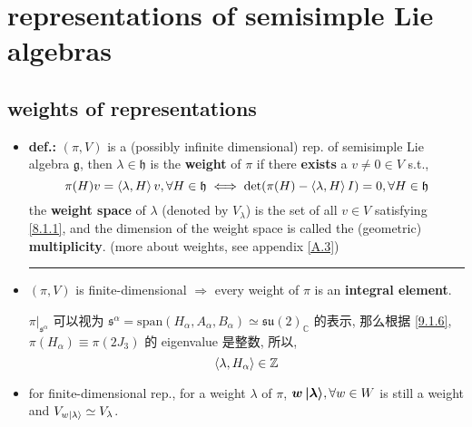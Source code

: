 \chapter{representations of semisimple Lie algebras}
\section{weights of representations}
\begin{itemize}
	\item \textbf{def.:} $(\pi, V)$ is a (possibly infinite dimensional) rep. of semisimple Lie algebra $\mathfrak{g}$, then $\lambda \in \mathfrak{h}$ is the \textbf{weight} of $\pi$ if there \textbf{exists} a $v \neq 0 \in V$ s.t.,
	\begin{equation} \label{8.1.1}
		\pi(H) v = \braket{\lambda, H} v, \forall H \in \mathfrak{h} \iff \det(\pi(H) - \braket{\lambda, H} I) = 0, \forall H \in \mathfrak{h}
	\end{equation}
	the \textbf{weight space} of $\lambda$ (denoted by $V_\lambda$) is the set of all $v \in V$ satisfying \eqref{8.1.1}, and the dimension of the weight space is called the (geometric) \textbf{multiplicity}. (more about weights, see appendix \ref{A.3})
	
	\noindent\rule[0.5ex]{\linewidth}{0.5pt} %
	
	\item $(\pi, V)$ is finite-dimensional $\Longrightarrow$ every weight of $\pi$ is an \textbf{integral element}.
	
	\begin{tcolorbox}[title=proof:]
		$\pi \big|_{\mathfrak{s}^\alpha}$ 可以视为 $\mathfrak{s}^\alpha = \mathrm{span}(H_\alpha, A_\alpha, B_\alpha) \simeq \mathfrak{su}(2)_\mathbb{C}$ 的表示, 那么根据 \eqref{9.1.6}, $\pi(H_\alpha) \equiv \pi(2 J_3)$ 的 eigenvalue 是整数, 所以,
		\begin{equation}
			\braket{\lambda, H_\alpha} \in \mathbb{Z}
		\end{equation}
	\end{tcolorbox}
	
	\item for finite-dimensional rep., for a weight $\lambda$ of $\pi$, $\boldsymbol{w \ket{\lambda}}, \forall w \in W$ is still a weight and $V_{w \ket{\lambda}} \simeq V_\lambda$.
	

\end{itemize}
